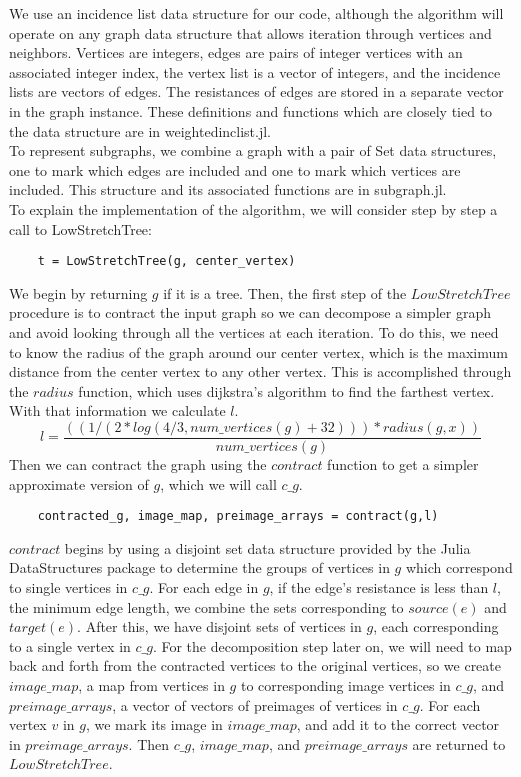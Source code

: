 \documentclass{article}
\begin{document}
We use an incidence list data structure for our code, although the algorithm will operate on any graph data structure that allows iteration through vertices and neighbors.  Vertices are integers, edges are pairs of integer vertices with an associated integer index, the vertex list is a vector of integers, and the incidence lists are vectors of edges.  The resistances of edges are stored in a separate vector in the graph instance.  These definitions and functions which are closely tied to the data structure are in weightedinclist.jl.\\
To represent subgraphs, we combine a graph with a pair of Set data structures, one to mark which edges are included and one to mark which vertices are included.  This structure and its associated functions are in subgraph.jl.\\	
To explain the implementation of the algorithm, we will consider step by step a call to LowStretchTree:\\
\begin{verbatim}
	t = LowStretchTree(g, center_vertex)
\end{verbatim}
We begin by returning $g$ if it is a tree.  Then, the first step of the $LowStretchTree$ procedure is to contract the input graph so we can decompose a simpler graph and avoid looking through all the vertices at each iteration.  To do this, we need to know the radius of the graph around our center vertex, which is the maximum distance from the center vertex to any other vertex.  This is accomplished through the $radius$ function, which uses dijkstra's algorithm to find the farthest vertex.  With that information we calculate $l$.
$$l=\frac{((1/(2*log(4/3,num\_vertices(g) + 32)))*radius(g, x))}{num\_vertices(g)}$$
 Then we can contract the graph using the $contract$ function to get a simpler approximate version of $g$, which we will call $c\_g$.
\begin{verbatim}
	contracted_g, image_map, preimage_arrays = contract(g,l)
\end{verbatim}
$contract$ begins by using a disjoint set data structure provided by the Julia DataStructures package to determine the groups of vertices in $g$ which correspond to single vertices in $c\_g$.  For each edge in $g$, if the edge's resistance is less than $l$, the minimum edge length, we combine the sets corresponding to $source(e)$ and $target(e)$.  After this, we have disjoint sets of vertices in $g$, each corresponding to a single vertex in $c\_g$.  For the decomposition step later on, we will need to map back and forth from the contracted vertices to the original vertices, so we create $image\_map$, a map from vertices in $g$ to corresponding image vertices in $c\_g$, and $preimage\_arrays$, a vector of vectors of preimages of vertices in $c\_g$.  For each vertex $v$ in $g$, we mark its image in $image\_map$, and add it to the correct vector in $preimage\_arrays$.  Then $c\_g$, $image\_map$, and $preimage\_arrays$ are returned to $LowStretchTree$.\\
\end{document}
